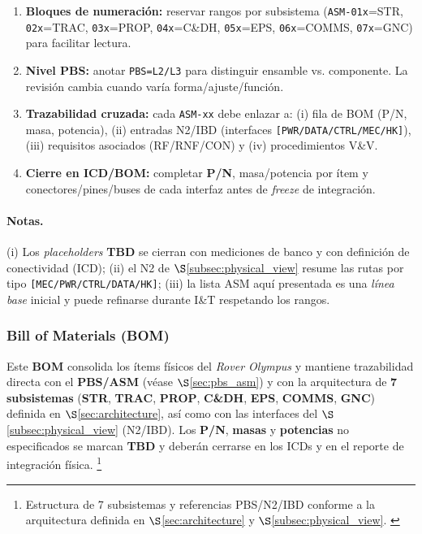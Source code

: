 \begin{enumerate}
  \item \textbf{Bloques de numeración:} reservar rangos por subsistema (\texttt{ASM-01x}=STR, \texttt{02x}=TRAC, \texttt{03x}=PROP, \texttt{04x}=C\&DH, \texttt{05x}=EPS, \texttt{06x}=COMMS, \texttt{07x}=GNC) para facilitar lectura. \cite{nasa_cm}
  \item \textbf{Nivel PBS:} anotar \texttt{PBS=L2/L3} para distinguir ensamble vs. componente. La revisión cambia cuando varía forma/ajuste/función. \cite{nasa_cm}
  \item \textbf{Trazabilidad cruzada:} cada \texttt{ASM-xx} debe enlazar a: (i) fila de BOM (P/N, masa, potencia), (ii) entradas N2/IBD (interfaces \texttt{[PWR/DATA/CTRL/MEC/HK]}), (iii) requisitos asociados (RF/RNF/CON) y (iv) procedimientos V\&V. \cite{nasa_cm}
  \item \textbf{Cierre en ICD/BOM:} completar \textbf{P/N}, masa/potencia por ítem y conectores/pines/buses de cada interfaz antes de \emph{freeze} de integración. \cite{nasa_cm}
\end{enumerate}

\paragraph{Notas.}
(i) Los \emph{placeholders} \textbf{TBD} se cierran con mediciones de banco y con definición de conectividad (ICD); (ii) el N2 de $\S$\ref{subsec:physical_view} resume las rutas por tipo \texttt{[MEC/PWR/CTRL/DATA/HK]}; (iii) la lista ASM aquí presentada es una \emph{línea base} inicial y puede refinarse durante I\&T respetando los rangos. \cite{nasa_cm}


\subsubsection{Bill of Materials (BOM)}
\label{sec:bom}

Este \textbf{BOM} consolida los ítems físicos del \emph{Rover Olympus} y mantiene trazabilidad directa con el \textbf{PBS/ASM} (véase $\S$\ref{sec:pbs_asm}) y con la arquitectura de \textbf{7 subsistemas} (\textbf{STR}, \textbf{TRAC}, \textbf{PROP}, \textbf{C\&DH}, \textbf{EPS}, \textbf{COMMS}, \textbf{GNC}) definida en $\S$\ref{sec:architecture}, así como con las interfaces del $\S$\ref{subsec:physical_view} (N2/IBD). Los \textbf{P/N}, \textbf{masas} y \textbf{potencias} no especificados se marcan \textbf{TBD} y deberán cerrarse en los ICDs y en el reporte de integración física.%
\footnote{Estructura de 7 subsistemas y referencias PBS/N2/IBD conforme a la arquitectura definida en $\S$\ref{sec:architecture} y $\S$\ref{subsec:physical_view}. \cite{nasa_cm}}

